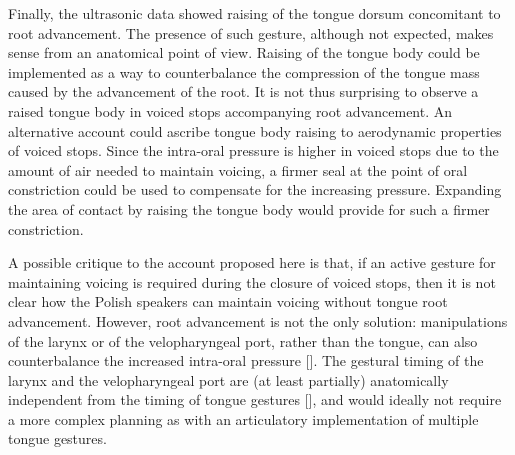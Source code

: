 \documentclass[authoryear, twocolumn]{elsarticle}
\begin{document}
Finally, the ultrasonic data showed raising of the tongue dorsum
concomitant to root advancement. The presence of such gesture, although
not expected, makes sense from an anatomical point of view. Raising of
the tongue body could be implemented as a way to counterbalance the
compression of the tongue mass caused by the advancement of the root. It
is not thus surprising to observe a raised tongue body in voiced stops
accompanying root advancement. An alternative account could ascribe
tongue body raising to aerodynamic properties of voiced stops. Since the
intra-oral pressure is higher in voiced stops due to the amount of air
needed to maintain voicing, a firmer seal at the point of oral
constriction could be used to compensate for the increasing pressure.
Expanding the area of contact by raising the tongue body would provide
for such a firmer constriction.

A possible critique to the account proposed here is that, if an active
gesture for maintaining voicing is required during the closure of voiced
stops, then it is not clear how the Polish speakers can maintain voicing
without tongue root advancement. However, root advancement is not the
only solution: manipulations of the larynx or of the velopharyngeal
port, rather than the tongue, can also counterbalance the increased
intra-oral pressure {[}{]}. The gestural timing of the larynx and the
velopharyngeal port are (at least partially) anatomically independent
from the timing of tongue gestures {[}{]}, and would ideally not require
a more complex planning as with an articulatory implementation of
multiple tongue gestures.


\end{document}
